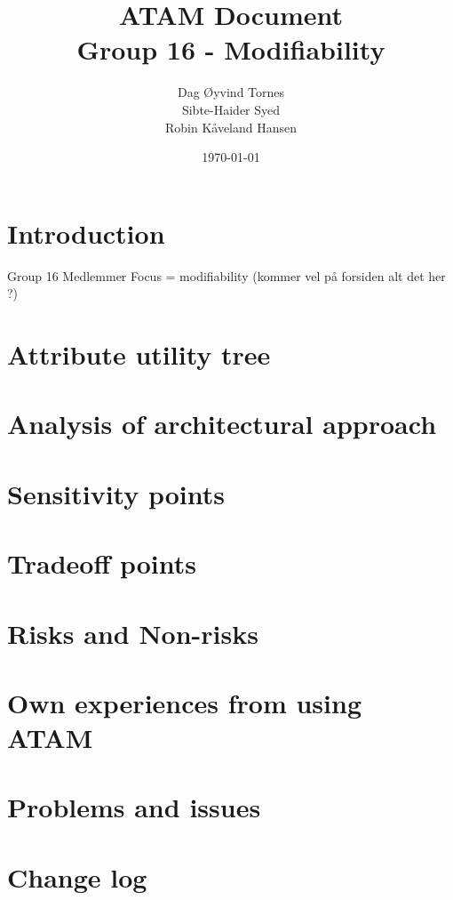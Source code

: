 \documentclass[titlepage,a4paper,11pt]{article}
\date{\today}
\begin{document}
\title{ATAM Document\\
 		Group 16 - Modifiability}

\author{Dag Øyvind Tornes\\
 		Sibte-Haider Syed\\ 
		Robin Kåveland Hansen\\}
\maketitle

\pagestyle{empty}
\tableofcontents
\clearpage
\pagestyle{plain}

\section{Introduction}
Group 16
Medlemmer
Focus = modifiability (kommer vel på forsiden alt det her ?)

\section{Attribute utility tree}


\section{Analysis of architectural approach}


\section{Sensitivity points}


\section{Tradeoff points}


\section{Risks and Non-risks}


\section{Own experiences from using ATAM}


\section{Problems and issues}


\section{Change log}

\end{document}

